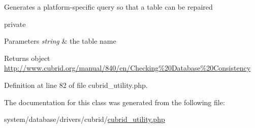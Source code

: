 Generates a platform-\/specific query so that a table can be repaired

private 
\begin{DoxyParams}{Parameters}
{\em string} & the table name \\
\hline
\end{DoxyParams}
\begin{DoxyReturn}{Returns}
object \hyperlink{}{http\-://www.\-cubrid.\-org/manual/840/en/\-Checking\%20\-Database\%20\-Consistency}
\end{DoxyReturn}


Definition at line 82 of file cubrid\-\_\-utility.\-php.



The documentation for this class was generated from the following file\-:\begin{DoxyCompactItemize}
\item 
system/database/drivers/cubrid/\hyperlink{cubrid__utility_8php}{cubrid\-\_\-utility.\-php}\end{DoxyCompactItemize}
